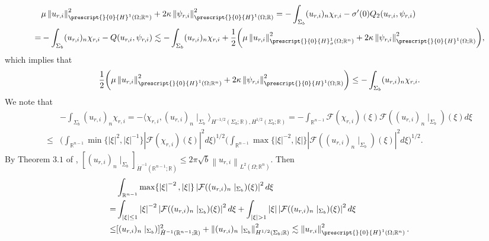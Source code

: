 \documentclass[11pt,letterpaper,reqno]{amsart}
\numberwithin{equation}{section}
\newcommand{\abs}[1]{\left\lvert#1\right\rvert}
\newcommand{\norm}[1]{\left\lVert#1\right\rVert}
\begin{document}
\begin{align}
    &\mu\norm{u_{r,i}}_{\prescript{}{0}{H}^{1}(\Omega;\mathbb{R}^{n})}^{2}+2\kappa\norm{\psi_{r,i}}_{\prescript{}{0}{H}^{1}(\Omega;\mathbb{R})}^{2} =-\int_{\Sigma_{b}}(u_{r,i})_{n}\chi_{r,i}-\sigma'(0)Q_{2}(u_{r,i},\psi_{r,i}) \nonumber\\
    =& -\int_{\Sigma_{b}}(u_{r,i})_{n}\chi_{r,i}-Q(u_{r,i},\psi_{r,i}) \lesssim-\int_{\Sigma_{b}}(u_{r,i})_{n}\chi_{r,i}+\frac{1}{2}\biggl(\mu\norm{u_{r,i}}_{\prescript{}{0}{H}^{1}_{\sigma}(\Omega;\mathbb{R}^{n})}^{2}+2\kappa\norm{\psi_{r,i}}_{\prescript{}{0}{H}^{1}(\Omega;\mathbb{R})}^{2}\biggr),
\end{align}
which implies that
\begin{align}
    \frac{1}{2}\biggl(\mu\norm{u_{r,i}}_{\prescript{}{0}{H}^{1}(\Omega;\mathbb{R}^{n})}^{2}+2\kappa\norm{\psi_{r,i}}_{\prescript{}{0}{H}^{1}(\Omega;\mathbb{R})}^{2}\biggr) \leq -\int_{\Sigma_{b}}(u_{r,i})_{n}\chi_{r,i}.
\end{align}
We note that
\begin{align}
    &-\int_{\Sigma_{b}}(u_{r,i})_{n}\chi_{r,i}=-\langle \chi_{r,i},(u_{r,i})_{n}\mid_{\Sigma_{b}} \rangle_{H^{-1/2}(\Sigma_{b};\mathbb{R}),H^{1/2}(\Sigma_{b};\mathbb{R})}=-\int_{\mathbb{R}^{n-1}}\mathcal{F}(\chi_{r,i})(\xi)\mathcal{F}((u_{r,i})_{n}\mid_{\Sigma_{b}})(\xi)d\xi \nonumber \\
    \leq&\biggl(\int_{\mathbb{R}^{n-1}}\min\{\abs{\xi}^{2},\abs{\xi}^{-1}\}\abs{\mathcal{F}(\chi_{r,i})(\xi)}^{2}d\xi\biggr)^{1/2} \biggl(\int_{\mathbb{R}^{n-1}}\max\{\abs{\xi}^{-2},\abs{\xi}\}\abs{\mathcal{F}((u_{r,i})_{n}\mid_{\Sigma_{b}})(\xi)}^{2}d\xi\biggr)^{1/2}.
\end{align}
By Theorem \(3.1\) of \cite{leoni2023traveling}, \([(u_{r,i})_{n}\mid_{\Sigma_{b}}]_{\dot{H}^{-1}(\mathbb{R}^{n-1};\mathbb{R})}\leq 2\pi\sqrt{b}\norm{u_{r,i}}_{L^{2}(\Omega;\mathbb{R}^{n})}\). Then
\begin{align}
    &\int_{\mathbb{R}^{n-1}}\max\{\abs{\xi}^{-2},\abs{\xi}\}\abs{\mathcal{F}((u_{r,i})_{n}\mid_{\Sigma_{b}})(\xi)}^{2}d\xi \nonumber\\
    =&\int_{\abs{\xi}\leq 1}\abs{\xi}^{-2}\abs{\mathcal{F}((u_{r,i})_{n}\mid_{\Sigma_{b}})(\xi)}^{2}d\xi+\int_{\abs{\xi}>1}\abs{\xi}\abs{\mathcal{F}((u_{r,i})_{n}\mid_{\Sigma_{b}})(\xi)}^{2}d\xi \nonumber\\
    \leq&[(u_{r,i})_{n}\mid_{\Sigma_{b}})]_{\dot{H}^{-1}(\mathbb{R}^{n-1};\mathbb{R})}^{2}+\norm{(u_{r,i})_{n}\mid_{\Sigma_{b}}}_{H^{1/2}(\Sigma_{b};\mathbb{R})}^{2} \lesssim\norm{u_{r,i}}_{\prescript{}{0}{H}^{1}(\Omega;\mathbb{R}^{n})}^{2}.
\end{align}
\end{document}
